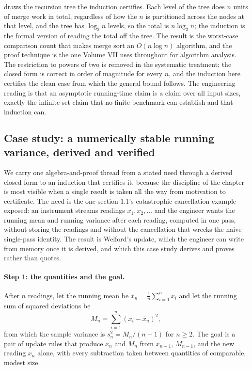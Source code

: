 

 draws the recursion tree the
induction certifies. Each level of the tree does $n$ units of merge
work in total, regardless of how the $n$ is partitioned across the
nodes at that level, and the tree has $\log_{2} n$ levels, so the total
is $n \log_{2} n$; the induction is the formal version of reading the
total off the tree. The result is the worst-case comparison count that
makes merge sort an $O(n \log n)$ algorithm, and the proof technique is
the one Volume VII uses throughout for algorithm analysis. The
restriction to powers of two is removed in the systematic treatment;
the closed form is correct in order of magnitude for every $n$, and the
induction here certifies the clean case from which the general bound
follows. The engineering reading is that an asymptotic running-time
claim is a claim over all input sizes, exactly the infinite-set claim
that no finite benchmark can establish and that induction can.

\subsection{Case study: a numerically stable running variance, derived
and verified}

We carry one algebra-and-proof thread from a stated need through a
derived closed form to an induction that certifies it, because the
discipline of the chapter is most visible when a single result is taken
all the way from motivation to certificate. The need is the one section
1.1's catastrophic-cancellation example exposed: an instrument streams
readings $x_{1}, x_{2}, \ldots$ and the engineer wants the running mean
and running variance after each reading, computed in one pass, without
storing the readings and without the cancellation that wrecks the
naive single-pass identity. The result is Welford's update, which the
engineer can write from memory once it is derived, and which this case
study derives and proves rather than quotes.

\paragraph{Step 1: the quantities and the goal.} After $n$ readings,
let the running mean be $\bar x_{n} = \frac{1}{n} \sum_{i=1}^{n} x_{i}$
and let the running sum of squared deviations be
\[
M_{n} = \sum_{i=1}^{n} (x_{i} - \bar x_{n})^{2},
\]
from which the sample variance is $s_{n}^{2} = M_{n}/(n - 1)$ for $n
\geq 2$. The goal is a pair of update rules that produce $\bar x_{n}$
and $M_{n}$ from $\bar x_{n-1}$, $M_{n-1}$, and the new reading $x_{n}$
alone, with every subtraction taken between quantities of comparable,
modest size.

